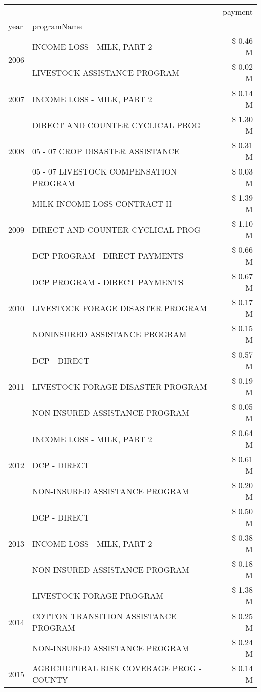 \begin{tabular}{llr}
\toprule
 &  & payment \\
year & programName &  \\
\midrule
\multirow[t]{2}{*}{2006} & INCOME LOSS - MILK, PART 2 & \$ 0.46 M \\
 & LIVESTOCK ASSISTANCE PROGRAM & \$ 0.02 M \\
\cline{1-3}
2007 & INCOME LOSS - MILK, PART 2 & \$ 0.14 M \\
\cline{1-3}
\multirow[t]{3}{*}{2008} & DIRECT AND COUNTER CYCLICAL PROG & \$ 1.30 M \\
 & 05 - 07 CROP DISASTER ASSISTANCE & \$ 0.31 M \\
 & 05 - 07 LIVESTOCK COMPENSATION PROGRAM & \$ 0.03 M \\
\cline{1-3}
\multirow[t]{3}{*}{2009} & MILK INCOME LOSS CONTRACT II & \$ 1.39 M \\
 & DIRECT AND COUNTER CYCLICAL PROG & \$ 1.10 M \\
 & DCP PROGRAM - DIRECT PAYMENTS & \$ 0.66 M \\
\cline{1-3}
\multirow[t]{3}{*}{2010} & DCP PROGRAM - DIRECT PAYMENTS & \$ 0.67 M \\
 & LIVESTOCK FORAGE DISASTER  PROGRAM & \$ 0.17 M \\
 & NONINSURED ASSISTANCE PROGRAM & \$ 0.15 M \\
\cline{1-3}
\multirow[t]{3}{*}{2011} & DCP - DIRECT & \$ 0.57 M \\
 & LIVESTOCK FORAGE DISASTER PROGRAM & \$ 0.19 M \\
 & NON-INSURED ASSISTANCE PROGRAM & \$ 0.05 M \\
\cline{1-3}
\multirow[t]{3}{*}{2012} & INCOME LOSS - MILK, PART 2 & \$ 0.64 M \\
 & DCP - DIRECT & \$ 0.61 M \\
 & NON-INSURED ASSISTANCE PROGRAM & \$ 0.20 M \\
\cline{1-3}
\multirow[t]{3}{*}{2013} & DCP - DIRECT & \$ 0.50 M \\
 & INCOME LOSS - MILK, PART 2 & \$ 0.38 M \\
 & NON-INSURED ASSISTANCE PROGRAM & \$ 0.18 M \\
\cline{1-3}
\multirow[t]{3}{*}{2014} & LIVESTOCK FORAGE PROGRAM & \$ 1.38 M \\
 & COTTON TRANSITION ASSISTANCE PROGRAM & \$ 0.25 M \\
 & NON-INSURED ASSISTANCE PROGRAM & \$ 0.24 M \\
\cline{1-3}
\multirow[t]{3}{*}{2015} & AGRICULTURAL RISK COVERAGE PROG - COUNTY & \$ 0.14 M \\

\end{tabular}
